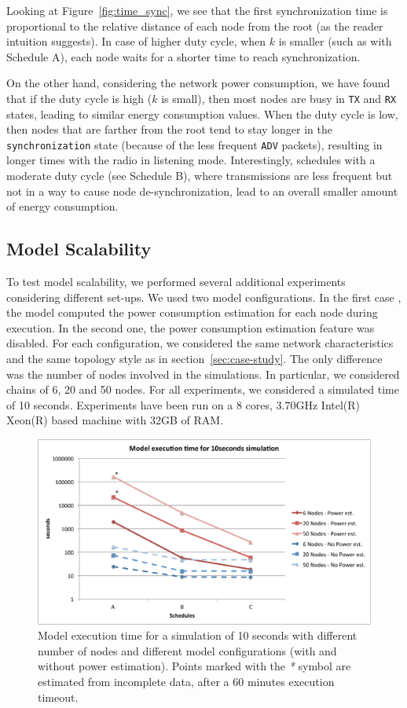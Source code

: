 Looking at Figure~\ref{fig:time_sync}, we see that the first synchronization time is proportional to the relative distance of each node from the root (as the reader intuition suggests). In case of higher duty cycle, when $k$ is smaller (such as with Schedule A), each node waits for a shorter time to reach synchronization. 

On the other hand, considering the network power consumption, we have found that if the duty cycle is high ($k$ is small), then most nodes are busy in \texttt{TX} and \texttt{RX} states, leading to similar energy consumption values. When the duty cycle is low, then nodes that are farther from the root tend to stay longer in the \texttt{synchronization} state (because of the less frequent \texttt{ADV} packets), resulting in longer times with the radio in listening mode. Interestingly, schedules with a moderate duty cycle (see Schedule B), where transmissions are less frequent but not in a way to cause node de-synchronization, lead to an overall smaller amount of energy consumption.

\subsection{Model Scalability}
\label{sec:scalability}

To test model scalability, we performed several additional experiments considering different set-ups.
We used two model configurations. In the first case , the model computed the power consumption estimation for each node during execution. In the second one, the power consumption estimation feature was disabled.
For each configuration, we considered the same network characteristics and the same topology style as in section~\ref{sec:case-study}. The only difference was the number of nodes involved in the simulations. In particular, we considered chains of 6, 20 and 50 nodes.
For all experiments, we considered a simulated time of 10 seconds.
Experiments have been run on a 8 cores, 3.70GHz Intel(R) Xeon(R) based machine with 32GB of RAM.

\begin{figure}[t]
\centering
\includegraphics[width=0.9\columnwidth]{figures/runtime}
\caption{Model execution time for a simulation of 10 seconds with different number of nodes and different model configurations (with and without power estimation). Points marked with the \emph{*} symbol are estimated from incomplete data, after a 60 minutes execution timeout.}
\label{fig:runtime}
\end{figure}

